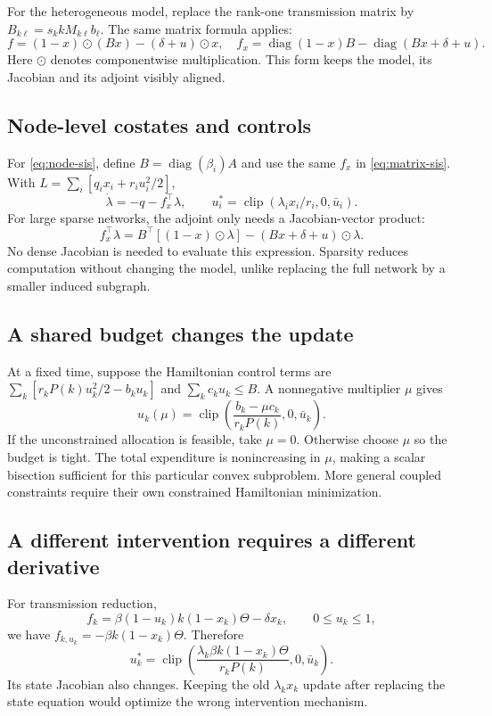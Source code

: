 \documentclass[11pt,a4paper]{article}
\DeclareMathOperator{\diag}{diag}
\DeclareMathOperator{\clip}{clip}
\theoremstyle{definition}
\theoremstyle{remark}
\begin{document}
For the heterogeneous model, replace the rank-one transmission matrix by
$B_{k\ell}=s_k kM_{k\ell}b_\ell$. The same matrix formula applies:
\begin{equation}
f=(1-x)\odot(Bx)-(\delta+u)\odot x,
\quad
f_x=\diag(1-x)B-\diag(Bx+\delta+u).
\label{eq:matrix-sis}
\end{equation}
Here $\odot$ denotes componentwise multiplication. This form keeps the model, its Jacobian and its adjoint visibly aligned.

\subsection{Node-level costates and controls}
For \eqref{eq:node-sis}, define $B=\diag(\beta_i)A$ and use the same $f_x$ in \eqref{eq:matrix-sis}. With $L=\sum_i[q_ix_i+r_i u_i^2/2]$,
\begin{equation}
\dot\lambda=-q-f_x^\top\lambda,\qquad
u_i^*=\clip(\lambda_i x_i/r_i,0,\bar u_i).
\end{equation}
For large sparse networks, the adjoint only needs a Jacobian-vector product:
\begin{equation}
f_x^\top\lambda
=B^\top[(1-x)\odot\lambda]-(Bx+\delta+u)\odot\lambda.
\label{eq:jvp}
\end{equation}
No dense Jacobian is needed to evaluate this expression. Sparsity reduces computation without changing the model, unlike replacing the full network by a smaller induced subgraph.

\subsection{A shared budget changes the update}
At a fixed time, suppose the Hamiltonian control terms are
$\sum_k[r_kP(k)u_k^2/2-b_ku_k]$ and $\sum_k c_ku_k\le B$. A nonnegative multiplier $\mu$ gives
\begin{equation}
u_k(\mu)=\clip\left(\frac{b_k-\mu c_k}{r_kP(k)},0,\bar u_k\right).
\end{equation}
If the unconstrained allocation is feasible, take $\mu=0$. Otherwise choose $\mu$ so the budget is tight. The total expenditure is nonincreasing in $\mu$, making a scalar bisection sufficient for this particular convex subproblem. More general coupled constraints require their own constrained Hamiltonian minimization.

\subsection{A different intervention requires a different derivative}
For transmission reduction,
\begin{equation}
f_k=\beta(1-u_k)k(1-x_k)\Theta-\delta x_k,
\qquad 0\le u_k\le1,
\end{equation}
we have $f_{k,u_k}=-\beta k(1-x_k)\Theta$. Therefore
\begin{equation}
u_k^*=\clip\left(
\frac{\lambda_k\beta k(1-x_k)\Theta}{r_kP(k)},0,\bar u_k\right).
\end{equation}
Its state Jacobian also changes. Keeping the old $\lambda_kx_k$ update after replacing the state equation would optimize the wrong intervention mechanism.
\end{document}
